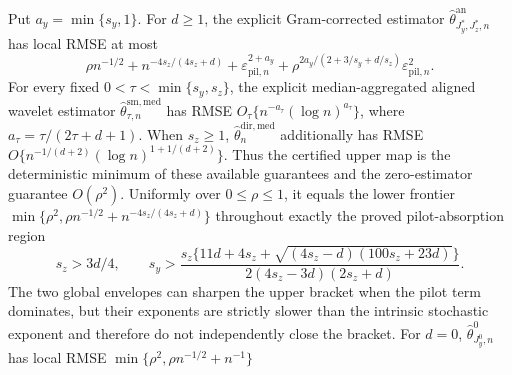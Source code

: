Put \(a_y=\min\{s_y,1\}\). For \(d\ge1\), the explicit Gram-corrected estimator \(\widehat\theta^{\mathrm{an}}_{J_y^*,J_z^*,n}\) has local RMSE at most
\[
\rho n^{-1/2}+n^{-4s_z/(4s_z+d)}+\varepsilon_{\mathrm{pil},n}^{2+a_y}+\rho^{2a_y/(2+3/s_y+d/s_z)}\varepsilon_{\mathrm{pil},n}^2.
\]
For every fixed \(0<\tau<\min\{s_y,s_z\}\), the explicit median-aggregated aligned wavelet estimator \(\widehat\theta^{\mathrm{sm,med}}_{\tau,n}\) has RMSE \(O_\tau\{n^{-a_\tau}(\log n)^{a_\tau}\}\), where \(a_\tau=\tau/(2\tau+d+1)\). When \(s_z\ge1\), \(\widehat\theta_n^{\mathrm{dir,med}}\) additionally has RMSE \(O\{n^{-1/(d+2)}(\log n)^{1+1/(d+2)}\}\). Thus the certified upper map is the deterministic minimum of these available guarantees and the zero-estimator guarantee \(O(\rho^2)\). Uniformly over \(0\le\rho\le1\), it equals the lower frontier \(\min\{\rho^2,\rho n^{-1/2}+n^{-4s_z/(4s_z+d)}\}\) throughout exactly the proved pilot-absorption region
\[
s_z>3d/4,
\qquad
s_y>\frac{s_z\{11d+4s_z+\sqrt{(4s_z-d)(100s_z+23d)}\}}{2(4s_z-3d)(2s_z+d)}.
\]
The two global envelopes can sharpen the upper bracket when the pilot term dominates, but their exponents are strictly slower than the intrinsic stochastic exponent and therefore do not independently close the bracket. For \(d=0\), \(\widehat\theta^0_{J_y^0,n}\) has local RMSE \(\min\{\rho^2,\rho n^{-1/2}+n^{-1}\}\)
